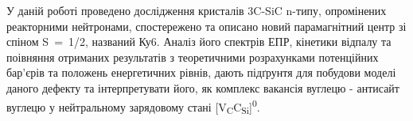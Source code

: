 У даній роботі проведено дослідження кристалів 3C-SiC n-типу, опромінених реакторними нейтронами, спостережено та описано новий парамагнітний центр зі спіном S~=~1/2, названий Ку6. Аналіз його спектрів ЕПР, кінетики відпалу та поівняння отриманих результатів з теоретичними розрахунками потенційних бар'єрів та положень енергетичних рівнів, дають підґрунтя для побудови моделі даного дефекту та інтерпретувати його, як комплекс вакансія вуглецю - антисайт вуглецю у нейтральному зарядовому стані [V\textsubscript{C}C\textsubscript{Si}]\textsuperscript{0}.
